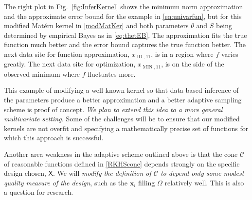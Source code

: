 \documentclass[11pt]{NSFamsart}
\DeclareMathOperator{\MIN}{MIN}
\DeclareMathOperator{\ID}{ID}
\newcommand{\mX}{\mathsf{X}}
\newcommand{\bx}{{\boldsymbol{x}}}
\newcommand{\calc}{{\mathcal{C}}}
\begin{document}
The right plot in Fig.\ \ref{fig:InferKernel} shows the minimum norm approximation and the approximate error bound for the example in \eqref{eq:univarfun}, but for this modified Mat\'ern kernel in \eqref{modMatKer} and both parameters $\theta$ and $S$ being determined by empirical Bayes as in \eqref{eq:thetEB}.  The approximation fits the true function much better and the error bound captures the true function better.  The next data site for function approximation, $x_{\ID,11}$, is in a region where $f$ varies greatly.  The next data site for optimization, $x_{\MIN,11}$,  is on the side of the observed minimum where $f$ fluctuates more.

This example of modifying a well-known kernel so that data-based inference of the parameters produce a better approximation and a better adaptive sampling scheme is proof of concept. \emph{ We plan to extend this idea to a more general multivariate setting.}  Some of the challenges will be to ensure that our modified kernels are not overfit and specifying a mathematically precise set of functions for which this approach is successful.

Another area weakness in the adaptive scheme outlined above is that the cone $\calc$ of reasonable functions defined in  \eqref{RKHScone} depends strongly on the specific design chosen, $\mX$.  We will \emph{modify the definition of $\calc$ to depend only some modest quality measure of the design}, such as the $\bx_i$ filling  $\Omega$ relatively well.  This is also a question for research.
\end{document}
